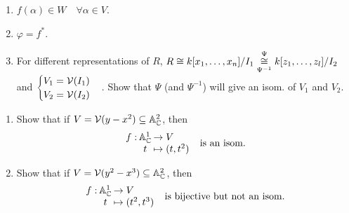 \begin{exercise} \mbox{}
  \begin{enumerate}
    \item $f(\alpha) \in W \quad \forall \alpha \in V$.
    \item $\varphi = f^*$.
    \item For different representations of $R$,
      $R \cong {k[x_1, \dots, x_n]}/{I_1} \underset{\Psi^{-1}}{\overset{\Psi}{\cong}}
      {k[z_1, \dots, z_l]}/{I_2}$
      and $\begin{cases}V_1 = \mathcal{V}(I_1) \\ V_2 = \mathcal{V}(I_2) \end{cases}$.
      Show that $\Psi$ (and $\Psi^{-1}$) will give an isom. of $V_1$ and $V_2$.
  \end{enumerate}
\end{exercise}

\begin{exercise} \mbox{}
  \begin{enumerate}
    \item Show that if $V = \mathcal{V}(y-x^2) \subseteq \mathbb{A}^2_{\mathbb{C}}$, then
      \[
        \deffunc{f}{\Ab_\Cb^1}{V}{t}{(t, t^2)}
        \quad \text{is an isom.}
      \]
    \item Show that if $V = \mathcal{V}(y^2-x^3) \subseteq \mathbb{A}^2_{\mathbb{C}}$, then
      \[
        \deffunc{f}{\Ab_\Cb^1}{V}{t}{(t^2, t^3)}
        \quad \text{is bijective but not an isom.}
      \]
  \end{enumerate}
\end{exercise}
